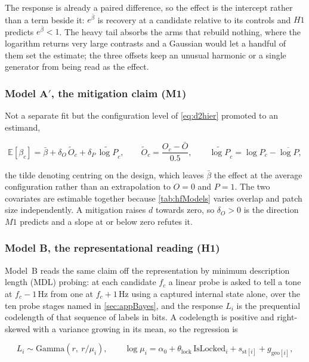 The response is already a paired difference, so the effect is the intercept rather than a term beside it: $e^{\bar\beta}$ is recovery at a candidate relative to its controls and $H1$ predicts $e^{\bar\beta}<1$. The heavy tail absorbs the arms that rebuild nothing, where the logarithm returns very large contrasts and a Gaussian would let a handful of them set the estimate; the three offsets keep an unusual harmonic or a single generator from being read as the effect.

\subsubsection*{Model A$'$, the mitigation claim (M1)}
Not a separate fit but the configuration level of \autoref{eq:d2hier} promoted to an estimand,

\begin{equation}
\label{eq:d2mitigation}
\mathbb{E}\!\left[\beta_c\right] = \bar\beta + \delta_O\,\widetilde O_c + \delta_P\,\widetilde{\log P}_c,
\qquad
\widetilde O_c=\frac{O_c-\bar O}{0.5},
\qquad
\widetilde{\log P}_c=\log P_c-\overline{\log P},
\end{equation}

the tilde denoting centring on the design, which leaves $\bar\beta$ the effect at the average configuration rather than an extrapolation to $O=0$ and $P=1$. The two covariates are estimable together because \autoref{tab:hfModels} varies overlap and patch size independently. A mitigation raises $d$ towards zero, so $\delta_O>0$ is the direction $M1$ predicts and a slope at or below zero refutes it.

\subsubsection*{Model B, the representational reading (H1)}
Model~B reads the same claim off the representation by minimum description length (MDL) probing\autocite{voitaInformationTheoreticProbingMinimum2020}: at each candidate $f_c$ a linear probe is asked to tell a tone at $f_c-1$\,Hz from one at $f_c+1$\,Hz using a captured internal state alone, over the ten probe stages named in \autoref{sec:appBayes}, and the response $L_i$ is the prequential codelength of that sequence of labels in bits. A codelength is positive and right-skewed with a variance growing in its mean, so the regression is

\begin{equation}
\label{eq:d2mdl}
L_i \sim \text{Gamma}\!\left(r,\ r/\mu_i\right),
\qquad
\log \mu_i = \alpha_0 + \theta_{\mathrm{lock}}\,\mathrm{IsLocked}_i + s_{\text{st}[i]} + g_{\text{geo}[i]},
\end{equation}

